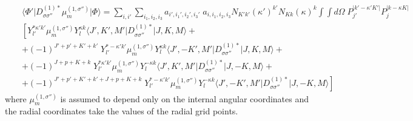 \begin{eqnarray} \nonumber &&
\langle \Phi' \vert D^{(1)*}_{\sigma \sigma''}
\mu^{(1,\sigma'')}_m \vert \Phi \rangle
= \sum_{i, i'} \sum_{i_1, i_2, i_3} 
a_{i', i_1', i_2', i_3'} \; a_{i, i_1, i_2, i_3} 
N_{K'k'} (\kappa')^{k'} N_{Kk} (\kappa)^{k} \int \int d\Omega \;
P^{\vert k'- \kappa' K' \vert}_{j'}
P^{\vert k - \kappa  K  \vert}_{j} 
\\ \nonumber &&
 \left[ 
 Y^{* \kappa' k'}_{l'} \mu^{(1,\sigma'')}_m Y^{\kappa k}_{l} \langle J',K',M' \vert D^{(1)*}_{\sigma \sigma''} \vert J,K,M \rangle +
\right.  
\\ \nonumber &&
 + (-1)^{J'+p'+K'+k'} \;
 Y^{* - \kappa' k'}_{l'} \mu^{(1,\sigma'')}_m Y^{\kappa k}_{l} \langle J',-K',M' \vert D^{(1)*}_{\sigma \sigma''} \vert J,K,M \rangle +
\\ \nonumber &&
 + (-1)^{J+p+K+k} \;
 Y^{* \kappa' k'}_{l'} \mu^{(1,\sigma'')}_m Y^{-\kappa k}_{l} \langle J',K',M' \vert D^{(1)*}_{\sigma \sigma''} \vert J,-K,M \rangle +
\\           &&
\left. + (-1)^{J'+p'+K'+k'+J+p+K+k} \;
 Y^{* -\kappa' k'}_{l'} \mu^{(1,\sigma'')}_m Y^{-\kappa k}_{l} \langle J',-K',M' \vert D^{(1)*}_{\sigma \sigma''} \vert J,-K,M \rangle
 \right]
\end{eqnarray}
where $\mu^{(1,\sigma'')}_m$ is assumed to depend only on the internal angular coordinates and 
the radial coordinates take the values of the radial grid points.


